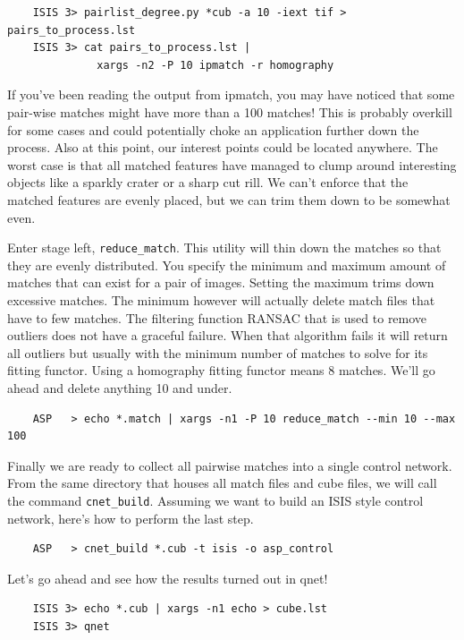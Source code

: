 \begin{verbatim}
    ISIS 3> pairlist_degree.py *cub -a 10 -iext tif > pairs_to_process.lst
    ISIS 3> cat pairs_to_process.lst |
              xargs -n2 -P 10 ipmatch -r homography
\end{verbatim}

If you've been reading the output from ipmatch, you may have noticed
that some pair-wise matches might have more than a 100 matches! This
is probably overkill for some cases and could potentially choke an
application further down the process. Also at this point, our interest
points could be located anywhere. The worst case is that all matched
features have managed to clump around interesting objects like a
sparkly crater or a sharp cut rill. We can't enforce that the matched
features are evenly placed, but we can trim them down to be somewhat
even.

Enter stage left, \texttt{reduce\_match}. This utility will thin down
the matches so that they are evenly distributed. You specify the
minimum and maximum amount of matches that can exist for a pair of
images. Setting the maximum trims down excessive matches. The minimum
however will actually delete match files that have to few matches. The
filtering function RANSAC that is used to remove outliers does not
have a graceful failure. When that algorithm fails it will return all
outliers but usually with the minimum number of matches to solve for
its fitting functor. Using a homography fitting functor means 8
matches. We'll go ahead and delete anything 10 and under.

\begin{verbatim}
    ASP   > echo *.match | xargs -n1 -P 10 reduce_match --min 10 --max 100
\end{verbatim}

Finally we are ready to collect all pairwise matches into a single
control network. From the same directory that houses all match files
and cube files, we will call the command
\texttt{cnet\_build}. Assuming we want to build an ISIS style control
network, here's how to perform the last step.

\begin{verbatim}
    ASP   > cnet_build *.cub -t isis -o asp_control
\end{verbatim}

Let's go ahead and see how the results turned out in qnet!

\begin{verbatim}
    ISIS 3> echo *.cub | xargs -n1 echo > cube.lst
    ISIS 3> qnet
\end{verbatim}

